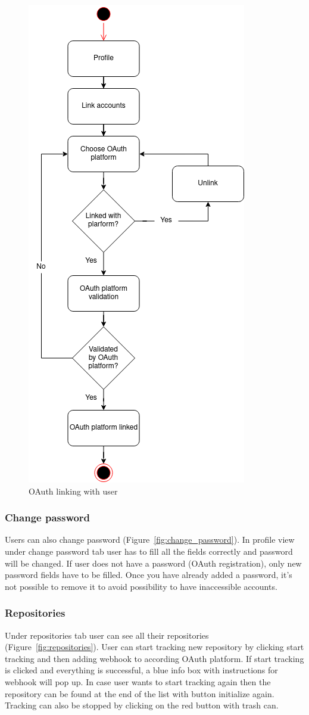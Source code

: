 \begin{figure}[H]
    \centering
    \includegraphics[width=0.5\linewidth]{figures/oauth_linking_user_flow}
    \caption{OAuth linking with user}
    \label{fig:account-linking}
\end{figure}

\subsubsection{Change password}\label{subsubsec:change-password}
Users can also change password (Figure~\ref{fig:change_password}).
In profile view under change password tab user has to fill all the fields correctly and password will be changed.
If user does not have a password (OAuth registration), only new password fields have to be filled.
Once you have already added a password, it's not possible to remove it to avoid possibility to have inaccessible accounts.

\subsubsection{Repositories}\label{subsubsec:repositories}
Under repositories tab user can see all their repositories (Figure~\ref{fig:repositories}).
User can start tracking new repository by clicking start tracking and then adding webhook to according OAuth platform.
If start tracking is clicked and everything is successful, a blue info box with instructions for webhook will pop up.
In case user wants to start tracking again then the repository can be found at the end of the list with button initialize again.
Tracking can also be stopped by clicking on the red button with trash can.

